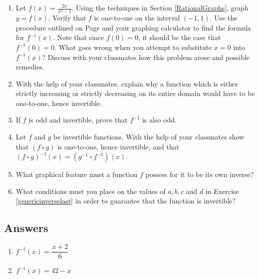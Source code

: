 \begin{enumerate}
\item  Let $f(x) = \frac{2x}{x^2-1}$.  Using the techniques in Section \ref{RationalGraphs}, graph $y=f(x)$.  Verify that $f$ is one-to-one on the interval $(-1,1)$.  Use the procedure outlined on Page \pageref{inverseprocedure} and your graphing calculator to find the formula for $f^{-1}(x)$.  Note that since $f(0) = 0$, it should be the case that $f^{-1}(0) = 0$.  What goes wrong when you attempt to substitute $x=0$ into $f^{-1}(x)$?  Discuss with your classmates how this problem arose and possible remedies.

\item With the help of your classmates, explain why a function which is either strictly increasing or strictly decreasing on its entire domain would have to be one-to-one, hence invertible.

\item If $f$ is odd and invertible, prove that $f^{-1}$ is also odd.

\item \label{fcircginverse} Let $f$ and $g$ be invertible functions.  With the help of your classmates show that $(f \circ g)$ is one-to-one, hence invertible, and that $(f \circ g)^{-1}(x) = (g^{-1} \circ f^{-1})(x)$.

\item What graphical feature must a function $f$ possess for it to be its own inverse?

\item \label{whatconditions} What conditions must you place on the values of $a, b, c$ and $d$ in Exercise \ref{genericinverselast} in order to guarantee that the function is invertible?

\end{enumerate}

\newpage

\subsection{Answers}

\begin{multicols}{2}
\begin{enumerate}

\item $f^{-1}(x) = \dfrac{x + 2}{6}$
\item $f^{-1}(x) = 42-x$

\setcounter{HW}{\value{enumi}}
\end{enumerate}
\end{multicols}

